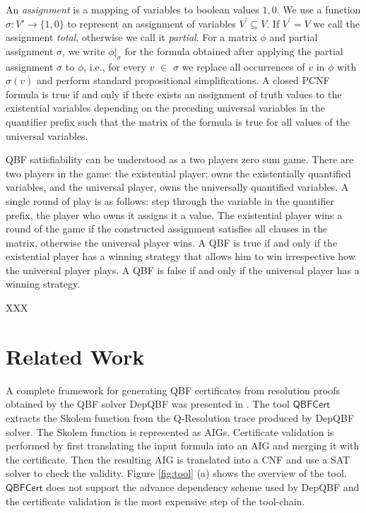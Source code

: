 \documentclass[runningheads]{llncs}
\newcommand{\qrpcert}{\mathsf{QBFCert}}
\newcommand{\matrixf}{\phi}
\newcommand{\qp}{\mathcal{Q}}
\newcommand{\0}{0}
\newcommand{\1}{1}
\begin{document}
An \textit{assignment} is a mapping of variables to boolean values $\1, \0$. We use a function $\sigma \colon V' \to \{\1, \0 \}$ to represent an assignment of variables $V^{\prime} \subseteq V$. If $V^{\prime} = V$ we call the assignment \emph{total}, otherwise we call it \emph{partial}. For a matrix $\matrixf$ and partial assignment $\sigma$, we write $\matrixf|_{\sigma}$ for the formula obtained after applying the partial assignment $\sigma$ to $\matrixf$, i.e., for every $v$ $\in$ $\sigma$ we replace all occurrences of $v$ in $\phi$ with $\sigma(v)$ and perform standard propositional simplifications.
A closed PCNF formula is true if and only if there exists an assignment of truth values to the existential variables depending on the preceding universal variables in the quantifier prefix such that the matrix of the formula is true for all values of the universal variables.
%

QBF satisfiability can be understood as a two players zero sum game. There are two players in the game: the existential player; owns the existentially quantified variables, and the universal player, owns the universally quantified variables. A single round of play is as follows: step through the variable in the quantifier prefix, the player who owns it assigns it a value. The existential player wins a round of the game if the constructed assignment satisfies all clauses in the matrix, otherwise the universal player wins. A QBF is true if and only if the existential player has a winning strategy that allows him to win irrespective how the universal player plays. A QBF is false if and only if the universal player has a winning strategy. 

XXX

\section{Related Work} \label{sec:related-work}

A complete framework for generating QBF certificates from resolution proofs obtained by the QBF solver DepQBF was presented in \cite{NiemetzPLSB12}. The tool $\qrpcert$ extracts the Skolem function \cite{BalabanovJ11} from the Q-Resolution trace produced by DepQBF solver. The Skolem function is represented as AIGs. Certificate validation is performed by first translating the input formula into an AIG  and merging it with the certificate. Then the resulting AIG is translated into a CNF and use a SAT solver to check the validity. Figure \ref{fig:tool} (a) shows the overview of the tool. $\qrpcert$ does not support the advance dependency scheme used by DepQBF and the certificate validation is the most expensive step of the tool-chain.  
 
\end{document}
